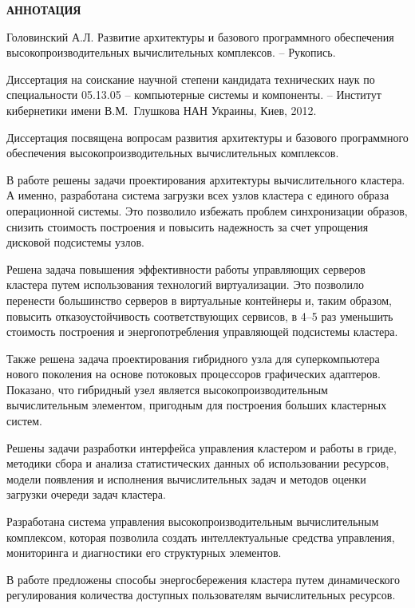 \vspace{0.5em}
\begin{center}
 \textbf{АННОТАЦИЯ}
\end{center}

Головинский А.Л. Развитие архитектуры и базового программного обеспечения высокопроизводительных вычислительных комплексов. -- Рукопись.

Диссертация на соискание научной степени кандидата технических наук по специальности 05.13.05 -- компьютерные системы и компоненты. -- Институт кибернетики имени В.М.~Глушкова НАН Украины, Киев, 2012.

Диссертация посвящена вопросам развития архитектуры и базового программного обеспечения высокопроизводительных вычислительных комплексов.

В работе решены задачи проектирования архитектуры вычислительного кластера. А именно, разработана система загрузки всех узлов кластера с единого образа операционной системы. Это позволило избежать проблем синхронизации образов, снизить стоимость построения и повысить надежность за счет упрощения дисковой подсистемы узлов.

Решена задача повышения эффективности работы управляющих серверов кластера путем использования технологий виртуализации. Это позволило перенести большинство серверов в виртуальные контейнеры и, таким образом, повысить отказоустойчивость соответствующих сервисов, в 4--5 раз уменьшить стоимость построения и энергопотребления управляющей подсистемы кластера.

Также решена задача проектирования гибридного узла для суперкомпьютера нового поколения на основе потоковых процессоров графических адаптеров. Показано, что гибридный узел является высокопроизводительным вычислительным элементом, пригодным для построения больших кластерных систем.

Решены задачи разработки интерфейса управления кластером и работы в гриде, методики сбора и анализа статистических данных об использовании ресурсов, модели появления и исполнения вычислительных задач и методов оценки загрузки очереди задач кластера.

Разработана система управления высокопроизводительным вычислительным комплексом, которая позволила создать интеллектуальные средства управления, мониторинга и диагностики его структурных элементов.

В работе предложены способы энергосбережения кластера путем динамического регулирования количества доступных пользователям вычислительных ресурсов.

